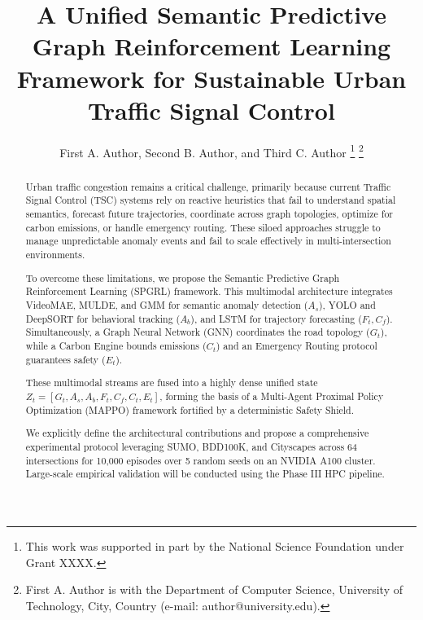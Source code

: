 \documentclass[journal]{IEEEtran}
\begin{document}
\title{A Unified Semantic Predictive Graph Reinforcement Learning Framework for Sustainable Urban Traffic Signal Control}
\author{First A. Author,
Second B. Author, and Third C. Author
\thanks{This work was supported in part by the National Science Foundation under Grant XXXX.}
\thanks{First A. Author is with the Department of Computer Science, University of Technology, City, Country (e-mail: author@university.edu).}}



\maketitle

\begin{abstract}
Urban traffic congestion remains a critical challenge, primarily because current Traffic Signal Control (TSC) systems rely on reactive heuristics that fail to understand spatial semantics, forecast future trajectories, coordinate across graph topologies, optimize for carbon emissions, or handle emergency routing. These siloed approaches struggle to manage unpredictable anomaly events and fail to scale effectively in multi-intersection environments.

To overcome these limitations, we propose the Semantic Predictive Graph Reinforcement Learning (SPGRL) framework. This multimodal architecture integrates VideoMAE, MULDE, and GMM for semantic anomaly detection ($A_s$), YOLO and DeepSORT for behavioral tracking ($A_b$), and LSTM for trajectory forecasting ($F_t, C_f$). Simultaneously, a Graph Neural Network (GNN) coordinates the road topology ($G_t$), while a Carbon Engine bounds emissions ($C_t$) and an Emergency Routing protocol guarantees safety ($E_t$).

These multimodal streams are fused into a highly dense unified state $Z_t = [G_t, A_s, A_b, F_t, C_f, C_t, E_t]$, forming the basis of a Multi-Agent Proximal Policy Optimization (MAPPO) framework fortified by a deterministic Safety Shield.

We explicitly define the architectural contributions and propose a comprehensive experimental protocol leveraging SUMO, BDD100K, and Cityscapes across 64 intersections for 10,000 episodes over 5 random seeds on an NVIDIA A100 cluster. Large-scale empirical validation will be conducted using the Phase III HPC pipeline.
\end{abstract}
\end{document}
